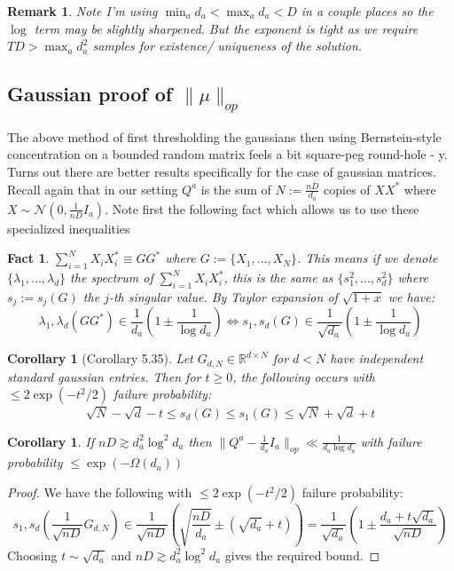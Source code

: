 \documentclass{article}
\newtheorem{corollary}[theorem]{Corollary}
\newtheorem{fact}[theorem]{Fact}
\newtheorem{remark}{Remark}
\newcommand{\R}{{\mathbb{R}}}
\begin{document}
\begin{remark} Note I'm using $\min_{a} d_{a} < \max_{a} d_{a} < D$ in a couple places so the $\log$ term may be slightly sharpened. But the exponent is tight as we require $TD > \max_{a} d_{a}^{2}$ samples for existence/ uniqueness of the solution.
\end{remark}


\subsection{Gaussian proof of $\|\mu\|_{op}$}
The above method of first thresholding the gaussians then using Bernstein-style concentration on a bounded random matrix feels a bit square-peg round-hole - y. Turns out there are better results specifically for the case of gaussian matrices. Recall again that in our setting $Q^{a}$ is the sum of $N := \frac{nD}{d_{a}}$ copies of $X X^{*}$ where $X \sim \mathcal{N}(0,\frac{1}{nD} I_{a})$. Note first the following fact which allows us to use these specialized inequalities

\begin{fact}
$\sum_{i=1}^{N} X_{i} X_{i}^{*} \equiv G G^{*} $ where $G := \{X_{1}, ..., X_{N}\}$.
This means if we denote $\{\lambda_{1}, ..., \lambda_{d}\}$ the spectrum of $\sum_{i=1}^{N} X_{i} X_{i}^{*}$, this is the same as $\{s_{1}^{2}, ..., s_{d}^{2}\}$ where $s_{j} := s_{j}(G)$ the $j$-th singular value. By Taylor expansion of $\sqrt{1+x}$ we have:
\[ \lambda_{1},\lambda_{d}(GG^{*}) \in \frac{1}{d_{a}} \left( 1 \pm \frac{1}{\log d_{a}} \right) \iff s_{1},s_{d}(G) \in  \frac{1}{\sqrt{d_{a}}} \left( 1 \pm \frac{1}{\log d_{a}} \right)  \]
\end{fact}


\begin{corollary} [Corollary 5.35]%
Let $G_{d,N} \in \R^{d \times N}$ for $d < N$ have independent standard gaussian entries. Then for $t \geq 0$, the following occurs with $\leq 2 \exp(-t^{2}/2)$ failure probability:
\[ \sqrt{N} - \sqrt{d} - t \leq s_{d}(G) \leq s_{1}(G) \leq \sqrt{N} + \sqrt{d} + t  \]
\end{corollary}

\begin{corollary}
If $nD \gtrsim d_{a}^{2} \log^{2} d_{a}$ then $\|Q^{a} - \frac{1}{d_{a}} I_{a} \|_{op} \ll \frac{1}{d_{a} \log d_{a}}$ with failure probability $\leq \exp( - \Omega(d_{a}))$
\end{corollary}
\begin{proof}
We have the following with $\leq 2 \exp(-t^{2}/2)$ failure probability:
\[ s_{1},s_{d}\left( \frac{1}{\sqrt{nD}} G_{d,N} \right) \in \frac{1}{\sqrt{nD}} \left( \sqrt{\frac{nD}{d_{a}}} \pm (\sqrt{d_{a}} + t) \right) = \frac{1}{\sqrt{d_{a}}}\left( 1 \pm \frac{d_{a} + t \sqrt{d_{a}}}{\sqrt{nD}}  \right)  \]
Choosing $t \sim \sqrt{d_{a}}$ and $nD \gtrsim d_{a}^{2} \log^{2} d_{a}$ gives the required bound.
\end{proof}
\end{document}

